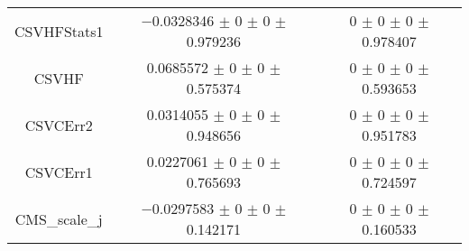\begin{table}
\begin{tabular}{ccc}
CSVHFStats1 & \num{-0.0328346} $\pm$ \num{0} $\pm$ \num{0} $\pm$ \num{0.979236} & \num{0} $\pm$ \num{0} $\pm$ \num{0} $\pm$ \num{0.978407}\\
CSVHF & \num{0.0685572} $\pm$ \num{0} $\pm$ \num{0} $\pm$ \num{0.575374} & \num{0} $\pm$ \num{0} $\pm$ \num{0} $\pm$ \num{0.593653}\\
CSVCErr2 & \num{0.0314055} $\pm$ \num{0} $\pm$ \num{0} $\pm$ \num{0.948656} & \num{0} $\pm$ \num{0} $\pm$ \num{0} $\pm$ \num{0.951783}\\
CSVCErr1 & \num{0.0227061} $\pm$ \num{0} $\pm$ \num{0} $\pm$ \num{0.765693} & \num{0} $\pm$ \num{0} $\pm$ \num{0} $\pm$ \num{0.724597}\\
CMS\_scale\_j & \num{-0.0297583} $\pm$ \num{0} $\pm$ \num{0} $\pm$ \num{0.142171} & \num{0} $\pm$ \num{0} $\pm$ \num{0} $\pm$ \num{0.160533}\\
\bottomrule
\end{tabular}
\end{table}